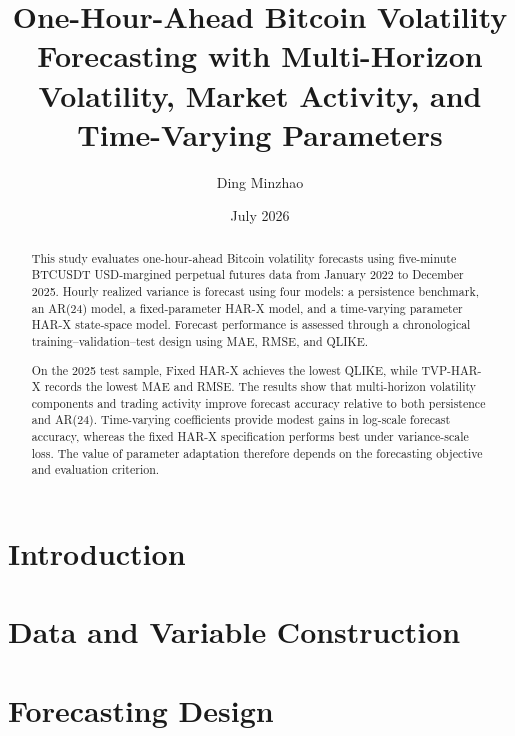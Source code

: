 \documentclass[11pt,a4paper]{article}
\title{
One-Hour-Ahead Bitcoin Volatility Forecasting with
Multi-Horizon Volatility, Market Activity, and
Time-Varying Parameters
}
\author{Ding Minzhao}
\date{July 2026}
\begin{document}
\maketitle

\begin{abstract}

This study evaluates one-hour-ahead Bitcoin volatility
forecasts using five-minute BTCUSDT USD-margined perpetual
futures data from January 2022 to December 2025. Hourly
realized variance is forecast using four models: a persistence
benchmark, an AR(24) model, a fixed-parameter HAR-X model, and
a time-varying parameter HAR-X state-space model. Forecast
performance is assessed through a chronological
training--validation--test design using MAE, RMSE, and QLIKE.

On the 2025 test sample, Fixed HAR-X achieves the lowest
QLIKE, while TVP-HAR-X records the lowest MAE and RMSE. The
results show that multi-horizon volatility components and
trading activity improve forecast accuracy relative to both
persistence and AR(24). Time-varying coefficients provide
modest gains in log-scale forecast accuracy, whereas the fixed
HAR-X specification performs best under variance-scale loss.
The value of parameter adaptation therefore depends on the
forecasting objective and evaluation criterion.

\end{abstract}

\tableofcontents

\newpage


\section{Introduction}
\label{sec:introduction}


\section{Data and Variable Construction}
\label{sec:data}


\section{Forecasting Design}
\label{sec:forecasting-design}

\end{document}
